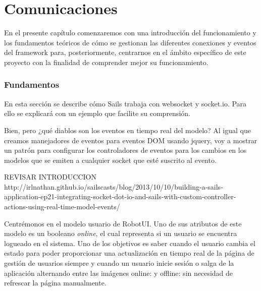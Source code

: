 \chapter{Comunicaciones}
\label{chap:robot}


En el presente capítulo comenzaremos con una introducción del funcionamiento y los fundamentos teóricos de cómo se gestionan las diferentes conexiones y eventos del framework para,
posteriormente, centrarnos en el ámbito específico de este proyecto con la finalidad de comprender mejor su funcionamiento.


\subsection{Fundamentos}
\label{sec:fundamentos}

En esta sección se describe cómo Sails trabaja con websocket y socket.io. Para ello se explicará con un ejemplo que facilite su comprensión.

Bien, pero ¿qué diablos son los eventos en tiempo real del modelo? Al igual que creamos manejadores de eventos para eventos DOM usando jquery, voy a mostrar un patrón para configurar los controladores de eventos para los cambios en los modelos que se emiten a cualquier socket que esté suscrito al evento.

REVISAR INTRODUCCION http://irlnathan.github.io/sailscasts/blog/2013/10/10/building-a-sails-application-ep21-integrating-socket-dot-io-and-sails-with-custom-controller-actions-using-real-time-model-events/



Centrémonos en el modelo usuario de RobotUI. Uno de sus atributos de este modelo es un booleano \emph{online}, el cual representa si un usuario se encuentra logueado en el sistema. Uno de los objetivos 
es saber cuando el usuario cambia el estado para poder proporcionar una actualización en tiempo real de la página de gestión de usuarios siempre y cuando un usuario inicie sesión o salga de la 
aplicación alternando entre las imágenes online:  y offline:  sin necesidad de refrescar la página manualmente.\\

